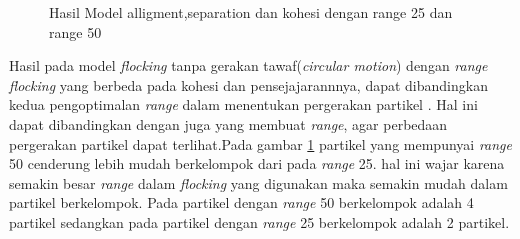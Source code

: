 \begin{figure}
\hfill
{}

\caption{Hasil Model alligment,separation dan kohesi dengan range 25 dan range 50}
\label{fig:2grafikmodel3gaya}
\end{figure}

Hasil pada model \textit{flocking} tanpa gerakan tawaf(\textit{circular motion}) dengan \textit{range} \textit{flocking} yang berbeda pada kohesi dan pensejajarannnya, dapat dibandingkan kedua pengoptimalan \textit{range} dalam menentukan pergerakan partikel . Hal ini dapat dibandingkan dengan \citep{HUTH1992} juga yang membuat \textit{range}, agar perbedaan pergerakan partikel dapat terlihat.Pada gambar \ref{fig:2grafikmodel3gaya} partikel yang mempunyai \textit{range} 50 cenderung lebih mudah berkelompok  dari pada \textit{range} 25. hal ini wajar karena semakin besar \textit{range} dalam \textit{flocking} yang digunakan maka semakin mudah dalam partikel berkelompok. Pada partikel dengan \textit{range} 50 berkelompok adalah 4 partikel sedangkan pada partikel dengan \textit{range} 25 berkelompok adalah 2 partikel. 


